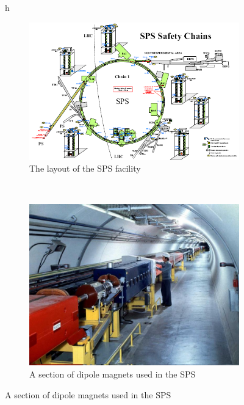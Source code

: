 \begin{figure}{h}
    \centering
    \begin{subfigure}[h]{0.45\textwidth}
        \includegraphics[width=\textwidth]{Figures/LHC_Diagrams/LHC__SPS__layout.png}
        \caption{The layout of the SPS facility \cite{LHC:LHC_sps_layout_image}}\label{fig:sps_layout}
      \end{subfigure}
      ~ %
    \begin{subfigure}[h]{0.45\textwidth}
        \includegraphics[width=\textwidth]{Figures/LHC_Diagrams/LHC__SPS__beamline.jpg}
        \caption{A section of dipole magnets used in the SPS \cite{LHC:LHC_sps_beamline_image}}\label{fig:sps_dipoles}

\end{subfigure}
\end{figure}
